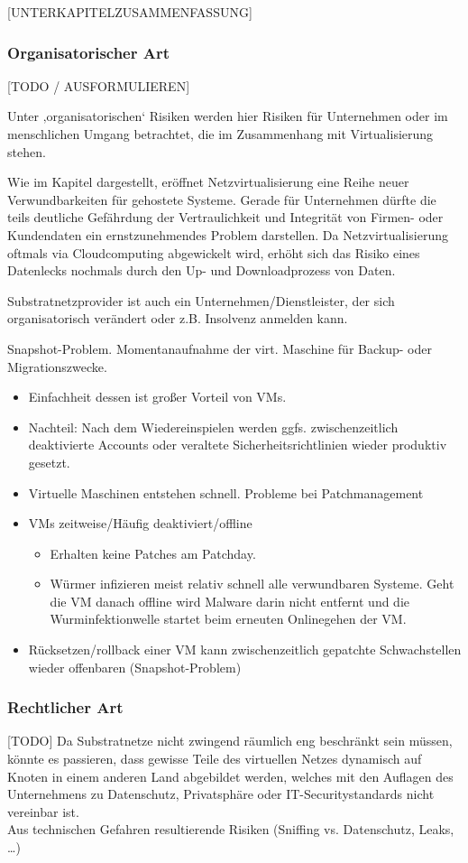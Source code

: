 [UNTERKAPITELZUSAMMENFASSUNG]


\subsubsection{Organisatorischer Art}
\label{subsubsec:gefahren_virt_organisatorisch}
[TODO / AUSFORMULIEREN]

Unter ‚organisatorischen‘ Risiken werden hier Risiken für Unternehmen oder im menschlichen Umgang betrachtet, die im Zusammenhang mit Virtualisierung stehen.

Wie im Kapitel  dargestellt, eröffnet Netzvirtualisierung eine Reihe neuer Verwundbarkeiten für gehostete Systeme. Gerade für Unternehmen dürfte die teils deutliche Gefährdung der Vertraulichkeit und Integrität von Firmen- oder Kundendaten ein ernstzunehmendes Problem darstellen. Da Netzvirtualisierung oftmals via Cloudcomputing abgewickelt wird, erhöht sich das Risiko eines Datenlecks nochmals durch den Up- und Downloadprozess von Daten.

Substratnetzprovider ist auch ein Unternehmen/Dienstleister, der sich organisatorisch verändert oder z.B. Insolvenz anmelden kann.

Snapshot-Problem. Momentanaufnahme der virt. Maschine für Backup- oder Migrationszwecke. 
\begin{itemize}
\item Einfachheit dessen ist großer Vorteil von VMs. 
\item Nachteil: Nach dem Wiedereinspielen werden ggfs. zwischenzeitlich deaktivierte Accounts oder veraltete Sicherheitsrichtlinien wieder produktiv gesetzt.
\item Virtuelle Maschinen entstehen schnell. Probleme bei Patchmanagement 
\item VMs zeitweise/Häufig deaktiviert/offline
\begin{itemize}
	\item Erhalten keine Patches am Patchday.
	\item Würmer infizieren meist relativ schnell alle verwundbaren Systeme. Geht die VM danach offline wird Malware darin nicht entfernt und die Wurminfektionwelle startet beim erneuten Onlinegehen der VM.
\end{itemize}
\item Rücksetzen/rollback einer VM kann zwischenzeitlich gepatchte Schwachstellen wieder offenbaren (Snapshot-Problem)
\end{itemize}





\subsubsection{Rechtlicher Art}
\label{subsubsec:gefahren_virt_rechtlich}
[TODO]
Da Substratnetze nicht zwingend räumlich eng beschränkt sein müssen, könnte es passieren, dass gewisse Teile des virtuellen Netzes dynamisch auf Knoten in einem anderen Land abgebildet werden, welches mit den Auflagen des Unternehmens zu Datenschutz, Privatsphäre oder IT-Securitystandards nicht vereinbar ist. \\
Aus technischen Gefahren resultierende Risiken (Sniffing vs. Datenschutz, Leaks, …)